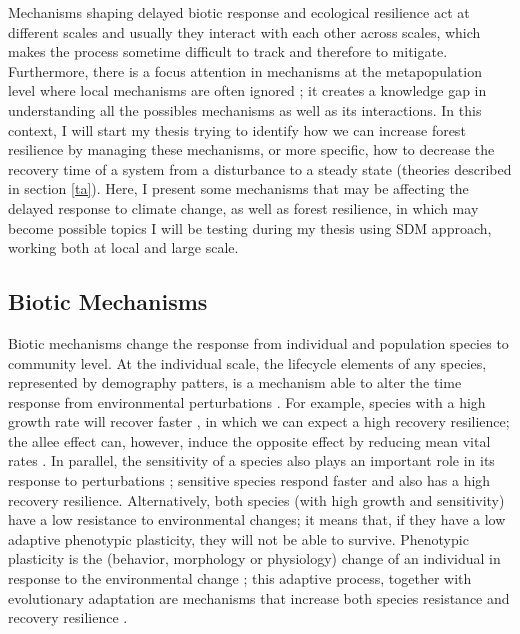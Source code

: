 Mechanisms shaping delayed biotic response and ecological resilience act at different scales and usually they interact with each other across scales, which makes the process sometime difficult to track and therefore to mitigate.
Furthermore, there is a focus attention in mechanisms at the metapopulation level where local mechanisms are often ignored \parencite{Hylander2013}; it creates a knowledge gap in understanding all the possibles mechanisms as well as its interactions.
In this context, I will start my thesis trying to identify how we can increase forest resilience by managing these mechanisms, or more specific, how to decrease the recovery time of a system from a disturbance to a steady state (theories described in section \ref{ta}).
Here, I present some mechanisms that may be affecting the delayed response to climate change, as well as forest resilience, in which may become possible topics I will be testing during my thesis using SDM approach, working both at local and large scale.

\subsection{Biotic Mechanisms}

Biotic mechanisms change the response from individual and population species to community level.
At the individual scale, the lifecycle elements of any species, represented by demography patters, is a mechanism able to alter the time response from environmental perturbations \parencite{Bertrand2016}.
For example, species with a high growth rate will recover faster \parencite{Grman2010}, in which we can expect a high recovery resilience; the allee effect can, however, induce the opposite effect by reducing mean vital rates \parencite{Dennis2002}.
In parallel, the sensitivity of a species also plays an important role in its response to perturbations \parencite{Oliver2015,Bertrand2016}; sensitive species respond faster and also has a high recovery resilience.
Alternatively, both species (with high growth and sensitivity) have a low resistance to environmental changes; it means that, if they have a low adaptive phenotypic plasticity, they will not be able to survive.
Phenotypic plasticity is the (behavior, morphology or physiology) change of an individual in response to the environmental change \parencite{Price2003}; this adaptive process, together with evolutionary adaptation \parencite{Bertrand2016} are mechanisms that increase both species resistance and recovery resilience \parencite{Essl2015,Oliver2015}.

